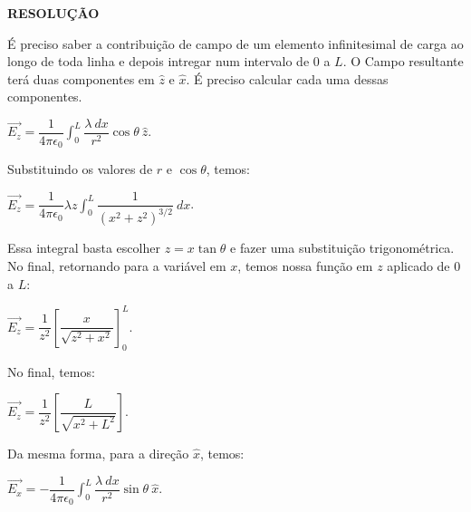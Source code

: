 \documentclass[11pt,a4paper]{article}
\begin{document}
\begin{enumerate}
\textbf{RESOLUÇÃO}

É preciso saber a contribuição de campo de um elemento infinitesimal de carga ao longo de toda linha e depois intregar num intervalo de $0$ a $L$. O Campo resultante terá duas componentes em $\hat{z}$ e $\hat{x}$. É preciso calcular cada uma dessas componentes.

\begin{center}

$\vec{E_z} = \displaystyle\dfrac{1}{4 \pi \epsilon_0} \displaystyle\int_0^L\displaystyle\dfrac{\lambda \ dx}{r^2}\cos \theta \ \hat{z}$.

\end{center}

Substituindo os valores de $r$ e $\cos \theta$, temos:

\begin{center}

$\vec{E_z} = \displaystyle\dfrac{1}{4 \pi \epsilon_0} \lambda z \displaystyle\int_0^L \displaystyle\dfrac{1}{\left(x^2 + z^2\right)^{3/2}} \ dx$.

\end{center}

Essa integral basta escolher $z = x \tan \theta$ e fazer uma substituição trigonométrica. No final, retornando para a variável em $x$, temos nossa função em $z$ aplicado de $0$ a $L$:

\begin{center}

$\vec{E_z} = \displaystyle\dfrac{1}{z^2} \left[\displaystyle\dfrac{x}{\sqrt{z^2 + x^2}}\right]_0^L$.

\end{center}

No final, temos:

\begin{center}

$\vec{E_z} = \displaystyle\dfrac{1}{z^2} \left[\displaystyle\dfrac{L}{\sqrt{x^2 + L^2}}\right]$.

\end{center}


Da mesma forma, para a direção $\hat{x}$, temos:

\begin{center}

$\vec{E_x} = - \displaystyle\dfrac{1}{4 \pi \epsilon_0} \displaystyle\int_0^L\displaystyle\dfrac{\lambda \ dx}{r^2}\sin \theta \ \hat{x}$.

\end{center}


\end{enumerate}
\end{document}
